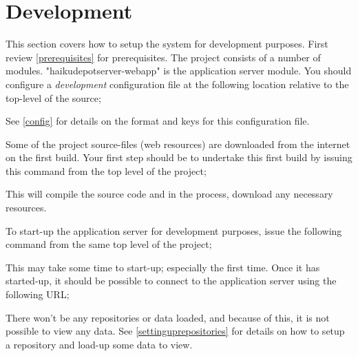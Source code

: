 \section{Development}

This section covers how to setup the system for development purposes.  First review \ref{prerequisites} for prerequisites.  The project consists of a number of modules.  "haikudepotserver-webapp" is the application server module.  You should configure a {\it development} configuration file at the following location relative to the top-level of the source;


See \ref{config} for details on the format and keys for this configuration file.

Some of the project source-files (web resources) are downloaded from the internet on the first build.  Your first step should be to undertake this first build by issuing this command from the top level of the project;


This will compile the source code and in the process, download any necessary resources.

To start-up the application server for development purposes, issue the following command from the same top level of the project;


This may take some time to start-up; especially the first time.  Once it has started-up, it should be possible to connect to the application server using the following URL;


There won't be any repositories or data loaded, and because of this, it is not possible to view any data.  See \ref{settinguprepositories} for details on how to setup a repository and load-up some data to view.
